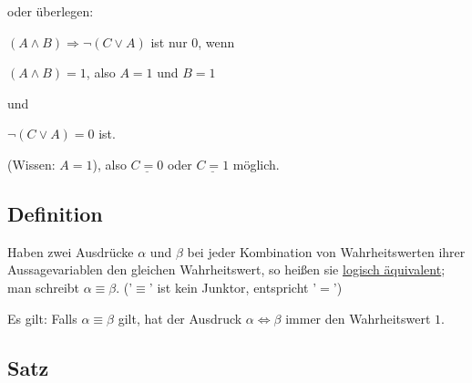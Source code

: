 \documentclass[a4paper, 12pt, twoside] {article}
\begin{document}
oder überlegen:

$(A \wedge B) \Rightarrow \neg  (C \lor A)$ ist nur 0, wenn

\qquad $(A \wedge B) = 1$, also $A = 1$ und $B = 1$

und

\qquad $\neg(C \lor A) = 0$ ist.

(Wissen: $A = 1$), also $\underline{C = 0}$ oder $ \underline{C = 1}$ möglich. 

\subsection{Definition}

Haben zwei Ausdrücke $\alpha$ und $\beta$ bei jeder Kombination von Wahrheitswerten ihrer Aussagevariablen den gleichen Wahrheitswert, so heißen sie \underline{logisch äquivalent}; man schreibt $\alpha \equiv \beta$. ('$\equiv$' ist kein Junktor, entspricht '$=$')

Es gilt: Falls $\alpha \equiv \beta$ gilt, hat der Ausdruck $\alpha \Leftrightarrow \beta$ immer den Wahrheitswert $1$.

\subsection{Satz}
\end{document}
